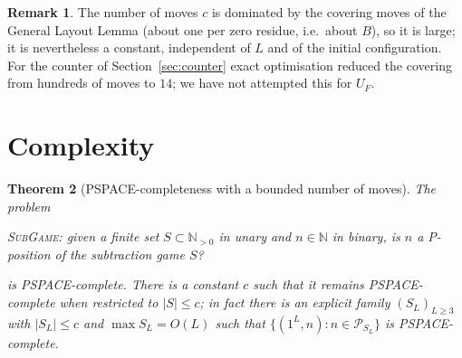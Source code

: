 \documentclass[11pt]{article}
\newtheorem{theorem}{Theorem}
\theoremstyle{definition}
\newtheorem{remark}[theorem]{Remark}
\newcommand{\N}{\mathbb{N}}
\newcommand{\cP}{\mathcal{P}}
\begin{document}
\begin{remark}
The number of moves $c$ is dominated by the covering moves of the General Layout Lemma (about one per
zero residue, i.e.\ about $B$), so it is large; it is nevertheless a constant, independent of $L$ and
of the initial configuration.  For the counter of Section~\ref{sec:counter} exact optimisation reduced
the covering from hundreds of moves to $14$; we have not attempted this for $U_F$.
\end{remark}

\section{Complexity}\label{sec:complexity}

\begin{theorem}[PSPACE-completeness with a bounded number of moves]\label{thm:pspace}
The problem
\begin{center}
\textsc{SubGame}: given a finite set $S\subset\N_{>0}$ in unary and $n\in\N$ in binary, is $n$ a
P-position of the subtraction game $S$?
\end{center}
is PSPACE-complete.  There is a constant $c$ such that it remains PSPACE-complete when restricted to
$|S|\le c$; in fact there is an explicit family $(S_L)_{L\ge3}$ with $|S_L|\le c$ and $\max S_L=O(L)$
such that $\{(1^L,n): n\in\cP_{S_L}\}$ is PSPACE-complete.
\end{theorem}
\end{document}
